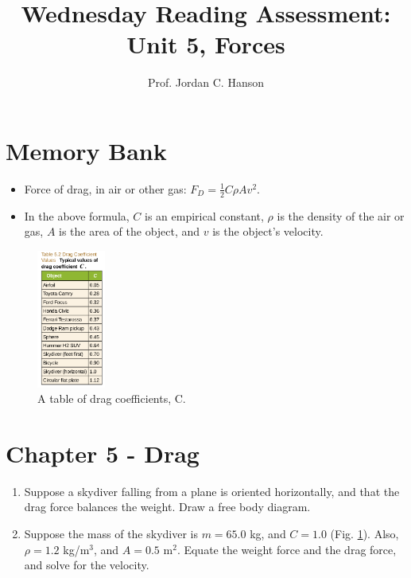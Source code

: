 \documentclass{article}
\begin{document}
\title{Wednesday Reading Assessment: Unit 5, Forces}
\author{Prof. Jordan C. Hanson}

\maketitle

\section{Memory Bank}

\begin{itemize}
\item Force of drag, in air or other gas: $F_D = \frac{1}{2}C \rho A v^2$.
\item In the above formula, $C$ is an empirical constant, $\rho$ is the density of the air or gas, $A$ is the area of the object, and $v$ is the object's velocity.
\end{itemize}
\begin{figure}[ht]
\centering
\includegraphics[width=0.2\textwidth]{drag.png}
\caption{\label{fig:drag} A table of drag coefficients, C.}
\end{figure}
\section{Chapter 5 - Drag}
\begin{enumerate}
\item Suppose a skydiver falling from a plane is oriented horizontally, and that the drag force balances the weight.  Draw a free body diagram. \\ \vspace{2cm}
\item Suppose the mass of the skydiver is $m = 65.0$ kg, and $C = 1.0$ (Fig. \ref{fig:drag}).  Also, $\rho = 1.2$ kg/m$^3$, and $A = 0.5$ m$^2$.  Equate the weight force and the drag force, and solve for the velocity.
\end{enumerate}
\end{document}
